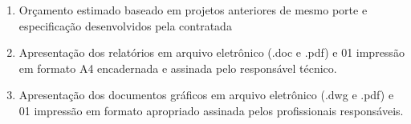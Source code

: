 \begin{enumerate}
\begin{enumerate}
			\item Orçamento estimado baseado em projetos anteriores de mesmo porte e especificação desenvolvidos pela contratada
			
			\item Apresentação dos relatórios em arquivo eletrônico (.doc e .pdf) e 01 impressão em formato A4 encadernada e assinada pelo responsável técnico.
			
			\item Apresentação dos documentos gráficos em arquivo eletrônico (.dwg e .pdf) e 01 impressão em formato apropriado assinada pelos profissionais responsáveis.

		\end{enumerate}
	
\end{enumerate}
